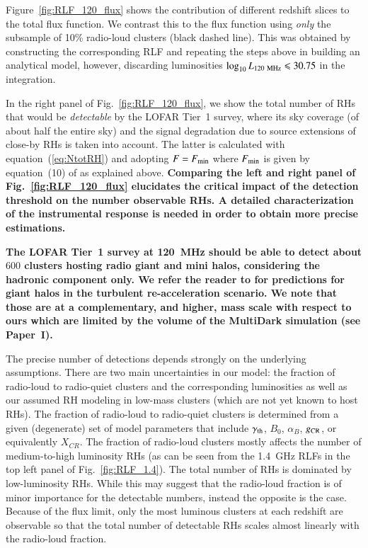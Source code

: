 \documentclass[useAMS,usenatbib]{mn2e}
\begin{document}
Figure~\ref{fig:RLF_120_flux} shows the contribution of different redshift
slices to the total flux function. We contrast this to the flux function using
\emph{only} the subsample of 10\% radio-loud clusters (black dashed line). This
was obtained by constructing the corresponding RLF and repeating the steps above
in building an analytical model, however, discarding luminosities $\log_{10}
L_{120~{\mathrm{MHz}}} \leqslant 30.75$ in the integration.

In the right panel of Fig.~\ref{fig:RLF_120_flux}, we show the total number of
RHs that would be \emph{detectable} by the LOFAR Tier~1 survey, where its sky
coverage (of about half the entire sky) and the signal degradation due to source
extensions of close-by RHs is taken into account. The latter is calculated with
equation~(\ref{eq:NtotRH}) and adopting $F = F_{{\mathrm{min}}}$ where
$F_{{\mathrm{min}}}$ is given by equation~(10) of \cite{2010A&A...509A..68C} as
explained above. {\bf Comparing the left and right panel of Fig.~\ref{fig:RLF_120_flux}
elucidates the critical impact of the detection threshold on the number observable RHs.
A detailed characterization of the instrumental response is needed in order
to obtain more precise estimations.}

{\bf The LOFAR Tier~1 survey at 120~MHz should be able to detect about
$600$ clusters hosting radio giant and mini halos, considering the hadronic 
component only. We refer the reader to \cite{2010A&A...509A..68C} 
for predictions for giant halos in the turbulent 
re-acceleration scenario. We note that those are at a complementary,
and higher, mass scale with respect to ours which are limited by the
volume of the MultiDark simulation (see Paper~I).} 

The precise number of detections depends strongly on the 
underlying assumptions. There are two main uncertainties
in our model: the fraction of radio-loud to radio-quiet clusters and the
corresponding luminosities as well as our assumed RH modeling in low-mass
clusters (which are not yet known to host RHs). The fraction of radio-loud to
radio-quiet clusters is determined from a given (degenerate) set of model
parameters that include $\gamma_{{\mathrm{th}}}$, $B_{0}$, $\alpha_{B}$,
$g_{{\mathrm{CR}}}$, or equivalently $X_{CR}$. The fraction of radio-loud clusters
mostly affects the number of medium-to-high luminosity RHs (as can be seen from
the 1.4~GHz RLFs in the top left panel of Fig.~\ref{fig:RLF_1.4}). The total
number of RHs is dominated by low-luminosity RHs. While this may suggest that
the radio-loud fraction is of minor importance for the detectable numbers,
instead the opposite is the case. Because of the flux limit, only the most
luminous clusters at each redshift are observable so that the total number of
detectable RHs scales almost linearly with the radio-loud fraction.
\end{document}

